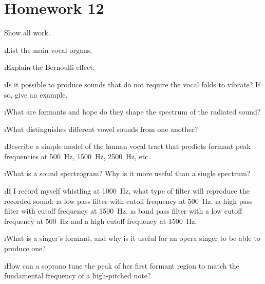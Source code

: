 \section{Homework 12}

\noindent
Show all work.

\ben

\i List the main vocal organs.

\i Explain the Bernoulli effect.

\i Is it possible to produce sounds that do not require the
vocal folds to vibrate?
If so, give an example.

\i What are formants and hope do they shape the spectrum of the
radiated sound?

\i What distinguishes different vowel sounds from one another?

\i Describe a simple model of the human vocal tract that 
predicts formant peak frequencies at 500~Hz, 1500~Hz, 2500~Hz, etc.

\i What is a sound spectrogram? 
Why is it more useful than a single spectrum?

\i If I record myself whistling at 1000~Hz, what type of filter 
will reproduce the recorded sound: 
\ben
\i a low pass filter with cutoff frequency at 500~Hz.
\i a high pass filter with cutoff frequency at 1500~Hz.
\i a band pass filter with a low cutoff frequency at 500~Hz
and a high cutoff frequency at 1500~Hz.
\een

\i What is a singer's formant, and why is it useful for an
opera singer to be able to produce one?

\i How can a soprano tune the peak of her first formant region
to match the fundamental frequency of a high-pitched note?

\een

